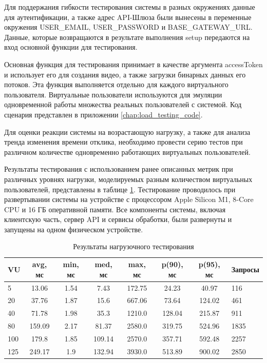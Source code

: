 	Для поддержания гибкости тестирования системы в разных окружениях данные для аутентификации, а также адрес API-Шлюза были вынесены в переменные окружения USER\_EMAIL, USER\_PASSWORD и BASE\_GATEWAY\_URL. Данные, которые возвращаются в результате выполнения setup передаются на вход основной функции для тестирования.

	Основная функция для тестирования принимает в качестве аргумента accessToken и использует его для создания видео, а также загрузки бинарных данных его потоков. Эта функция выполняется отдельно для каждого виртуального пользователя. Виртуальные пользователи используются для эмуляции одновременной работы множества реальных пользователей с системой. Код сценария представлен в приложении \ref{chap:load_testing_code}.

	Для оценки реакции системы на возрастающую нагрузку, а также для анализа тренда изменения времени отклика, необходимо провести серию тестов при различном количестве одновременно работающих виртуальных пользователей.

	Результаты тестирования с использованием ранее описанных метрик при различных уровнях нагрузки, моделируемых разным количеством виртуальных пользователей, представлены в таблице \ref{tab:load_testing_results}. Тестирование проводилось при развертывании системы на устройстве с процессором Apple Silicon M1, 8‑Core CPU и 16 ГБ оперативной памяти. Все компоненты системы, включая клиентскую часть, сервер API и сервисы обработки, были развернуты и запущены на одном физическом устройстве.

	\begin{table}[h!]
		\centering
		\renewcommand{\arraystretch}{1.2}
		\begin{tabular}{|p{1.5cm}|c|c|c|c|c|c|p{2cm}|}
			\hline
			\textbf{VU} & \textbf{avg, мс} & \textbf{min, мс} & \textbf{med, мс} & \textbf{max, мс} & \textbf{p(90), мс} & \textbf{p(95), мс} & \textbf{Запросы} \\
			\hline
			5   & 13.06 & 1.54 & 7.43  & 172.75 & 24.23  & 40.97  & 116 \\
			\hline
			20  & 37.76 & 1.87 & 15.6  & 667.06 & 73.64  & 124.02 & 461 \\
			\hline
			40  & 71.78 & 1.98 & 35.3  & 1210.0 & 128.04 & 215.87 & 911 \\
			\hline
			80  & 159.09 & 2.17 & 81.37  & 2580.0 & 319.75 & 524.96 & 1835 \\
			\hline
			100 & 179.8  & 1.85 & 109.14 & 2570.0 & 357.71 & 592.48 & 2257 \\
			\hline
			125 & 249.17 & 1.9  & 132.94 & 3930.0 & 513.89 & 900.02 & 2850 \\
			\hline
		\end{tabular}
		\caption{Результаты нагрузочного тестирования}
		\label{tab:load_testing_results}
	\end{table}

